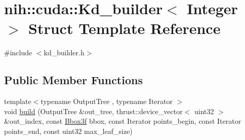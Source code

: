 \hypertarget{structnih_1_1cuda_1_1_kd__builder}{
\section{nih\-:\-:cuda\-:\-:\-Kd\-\_\-builder$<$ \-Integer $>$ \-Struct \-Template \-Reference}
\label{structnih_1_1cuda_1_1_kd__builder}
}


{\ttfamily \#include $<$kd\-\_\-builder.\-h$>$}

\subsection*{\-Public \-Member \-Functions}
\begin{DoxyCompactItemize}
\item 
{\footnotesize template$<$typename Output\-Tree , typename Iterator $>$ }\\void \hyperlink{structnih_1_1cuda_1_1_kd__builder_a227e02ff324dfb9c251fee6954e942c8}{build} (\-Output\-Tree \&out\-\_\-tree, thrust\-::device\-\_\-vector$<$ uint32 $>$ \&out\-\_\-index, const \hyperlink{structnih_1_1_bbox}{\-Bbox3f} bbox, const \-Iterator points\-\_\-begin, const \-Iterator points\-\_\-end, const uint32 max\-\_\-leaf\-\_\-size)
\end{DoxyCompactItemize}
